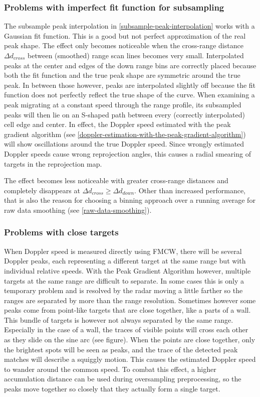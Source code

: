\subsubsection{Problems with imperfect fit function for subsampling} \label{problems-with-imperfect-fit-function-for-subsampling}
The subsample peak interpolation in \cref{subsample-peak-interpolation} works with a Gaussian fit function. This is a good but not perfect approximation of the real peak shape. The effect only becomes noticeable when the cross-range distance $\Delta d_{cross}$ between (smoothed) range scan lines becomes very small. Interpolated peaks at the center and edges of the down range bins are correctly placed because both the fit function and the true peak shape are symmetric around the true peak. In between those however, peaks are interpolated slightly off because the fit function does not perfectly reflect the true shape of the curve. When examining a peak migrating at a constant speed through the range profile, its subsampled peaks will then lie on an S-shaped path between every (correctly interpolated) cell edge and center. In effect, the Doppler speed estimated with the peak gradient algorithm (see \cref{doppler-estimation-with-the-peak-gradient-algorithm}) will show oscillations around the true Doppler speed. Since wrongly estimated Doppler speeds cause wrong reprojection angles, this causes a radial smearing of targets in the reprojection map.

The effect becomes less noticeable with greater cross-range distances and completely disappears at $\Delta d_{cross} \ge \Delta d_{down}$. Other than increased performance, that is also the reason for choosing a binning approach over a running average for raw data smoothing (see \cref{raw-data-smoothing}).

\subsubsection{Problems with close targets}\label{problems-with-close-targets}

When Doppler speed is measured directly using FMCW, there will be
several Doppler peaks, each representing a different target at the same
range but with individual relative speeds. With the Peak Gradient
Algorithm however, multiple targets at the same range are difficult to
separate. In some cases this is only a temporary problem and is resolved
by the radar moving a little farther so the ranges are separated by more
than the range resolution. Sometimes however some peaks come from
point-like targets that are close together, like a parts of a wall. This
bundle of targets is however not always separated by the same range.
Especially in the case of a wall, the traces of visible points will
cross each other as they slide on the sine arc (see figure). When the
points are close together, only the brightest spots will be seen as
peaks, and the trace of the detected peak matches will describe a
squiggly motion. This causes the estimated Doppler speed to wander
around the common speed. To combat this effect, a higher accumulation
distance can be used during oversampling preprocessing, so the peaks
move together so closely that they actually form a single target.

